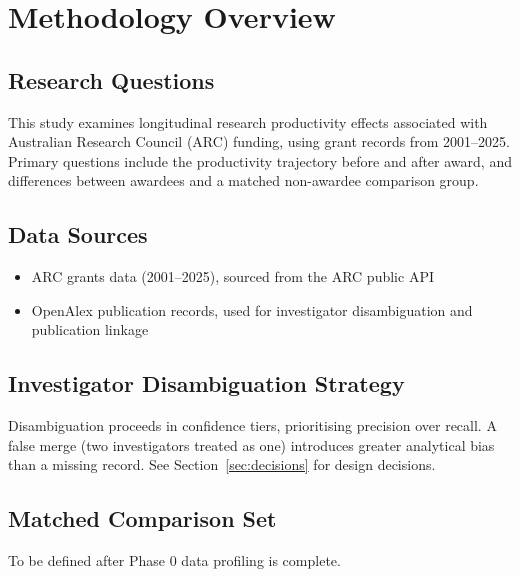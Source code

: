 \section{Methodology Overview}

\subsection{Research Questions}
This study examines longitudinal research productivity effects associated with
Australian Research Council (ARC) funding, using grant records from 2001--2025.
Primary questions include the productivity trajectory before and after award,
and differences between awardees and a matched non-awardee comparison group.

\subsection{Data Sources}
\begin{itemize}
    \item ARC grants data (2001--2025), sourced from the ARC public API
    \item OpenAlex publication records, used for investigator disambiguation
    and publication linkage
\end{itemize}

\subsection{Investigator Disambiguation Strategy}
Disambiguation proceeds in confidence tiers, prioritising precision over recall.
A false merge (two investigators treated as one) introduces greater analytical
bias than a missing record. See Section~\ref{sec:decisions} for design decisions.

\subsection{Matched Comparison Set}
To be defined after Phase 0 data profiling is complete.